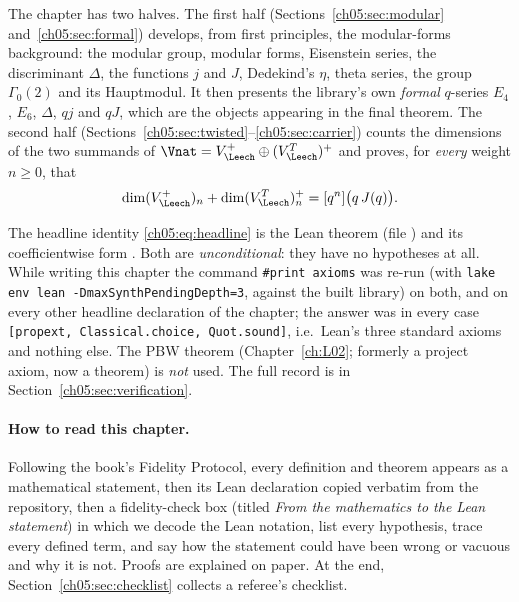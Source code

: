 The chapter has two halves. The first half (Sections~\ref{ch05:sec:modular}
and~\ref{ch05:sec:formal}) develops, from first principles, the modular-forms background: the
modular group, modular forms, Eisenstein series, the discriminant $\Delta$, the functions $j$ and
$J$, Dedekind's $\eta$, theta series, the group $\Gamma_0(2)$ and its Hauptmodul. It then presents
the library's own \emph{formal} $q$-series $E_4$, $E_6$, $\Delta$, $qj$ and $qJ$, which are the
objects appearing in the final theorem. The second half
(Sections~\ref{ch05:sec:twisted}--\ref{ch05:sec:carrier}) counts the dimensions of the two summands
of $\Vnat = V_\Leech^+ \oplus (V_\Leech^T)^+$ and proves, for \emph{every} weight $n\ge0$, that
\begin{equation}\label{ch05:eq:headline}
  \dim (V_\Leech^+)_n + \dim (V_\Leech^T)^+_n = [q^{n}]\bigl(q\,J(q)\bigr).
\end{equation}

\begin{status}
The headline identity \eqref{ch05:eq:headline} is the Lean theorem
 (file ) and
its coefficientwise form . Both are
\emph{unconditional}: they have no hypotheses at all. While writing this chapter the command
\texttt{\#print axioms} was re-run (with \texttt{lake env lean -DmaxSynthPendingDepth=3}, against the
built library) on both, and on every other headline declaration of the chapter; the answer was in
every case \texttt{[propext, Classical.choice, Quot.sound]}, i.e.\ Lean's three standard axioms and
nothing else. The PBW theorem  (Chapter~\ref{ch:L02}; formerly a project axiom, now a theorem) is \emph{not} used. The full record is in
Section~\ref{ch05:sec:verification}.
\end{status}

\paragraph{How to read this chapter.}
Following the book's Fidelity Protocol, every definition and theorem appears as a mathematical
statement, then its Lean declaration copied verbatim from the repository, then a fidelity-check
box (titled \emph{From the mathematics to the Lean statement}) in which we decode the Lean
notation, list every hypothesis, trace every defined term, and say how the statement could have
been wrong or vacuous and why it is not. Proofs are explained on paper. At the end,
Section~\ref{ch05:sec:checklist} collects a referee's checklist.

